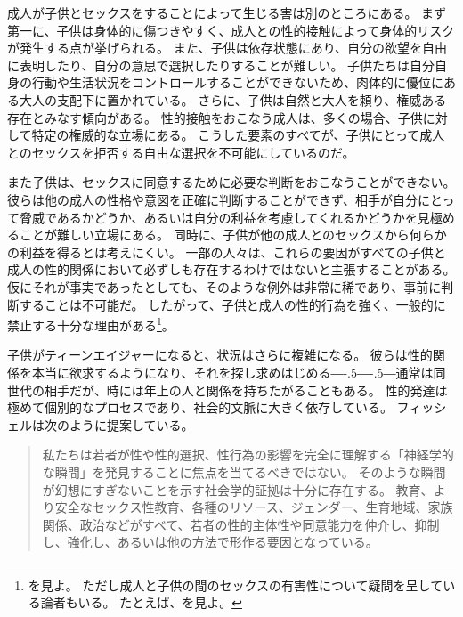 \documentclass[paper=a4,book,openany]{jlreq}
\def\DDASH{―\kern-.5\zw―\kern-.5\zw―} %
\begin{document}
成人が子供とセックスをすることによって生じる害は別のところにある。
まず第一に、子供は身体的に傷つきやすく、成人との性的接触によって身体的リスクが発生する点が挙げられる。
また、子供は依存状態にあり、自分の欲望を自由に表明したり、自分の意思で選択したりすることが難しい。
子供たちは自分自身の行動や生活状況をコントロールすることができないため、肉体的に優位にある大人の支配下に置かれている。
さらに、子供は自然と大人を頼り、権威ある存在とみなす傾向がある。
性的接触をおこなう成人は、多くの場合、子供に対して特定の権威的な立場にある。
こうした要素のすべてが、子供にとって成人とのセックスを拒否する自由な選択を不可能にしているのだ。

また子供は、セックスに同意するために必要な判断をおこなうことができない。
彼らは他の成人の性格や意図を正確に判断することができず、相手が自分にとって脅威であるかどうか、あるいは自分の利益を考慮してくれるかどうかを見極めることが難しい立場にある。
同時に、子供が他の成人とのセックスから何らかの利益を得るとは考えにくい。
一部の人々は、これらの要因がすべての子供と成人の性的関係において必ずしも存在するわけではないと主張することがある。
仮にそれが事実であったとしても、そのような例外は非常に稀であり、事前に判断することは不可能だ。
したがって、子供と成人の性的行為を強く、一般的に禁止する十分な理由がある\footnote{ \citet{malon15:_adult_child_sex_limit_liber_sexual_moral}を見よ。
ただし成人と子供の間のセックスの有害性について疑問を呈している論者もいる。
たとえば\citet{levine02:_harmf_minor}、\citet{brongersma90:_boy_lover_their_influen_boys}を見よ。
}。
\nocite{levine02:_harmf_minor} \nocite{brongersma90:_boy_lover_their_influen_boys}

子供がティーンエイジャーになると、状況はさらに複雑になる。
彼らは性的関係を本当に欲求するようになり、それを探し求めはじめる{\DDASH}通常は同世代の相手だが、時には年上の人と関係を持ちたがることもある。
性的発達は極めて個別的なプロセスであり、社会的文脈に大きく依存している。
フィッシェルは次のように提案している。

\begin{quote}
私たちは若者が性や性的選択、性行為の影響を完全に理解する「神経学的な瞬間」を発見することに焦点を当てるべきではない。
そのような瞬間が幻想にすぎないことを示す社会学的証拠は十分に存在する。
教育、より安全なセックス性教育、各種のリソース、ジェンダー、生育地域、家族関係、政治などがすべて、若者の性的主体性や同意能力を仲介し、抑制し、強化し、あるいは他の方法で形作る要因となっている。
\citep[p.305]{fischel10:_per_se_power}
\end{quote}
\end{document}
